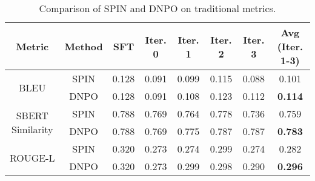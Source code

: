 \begin{appendices}
\begin{table}[ht]
\centering
\small
\renewcommand{\arraystretch}{0.9} %
\caption{Comparison of SPIN and DNPO on traditional metrics.}
\label{table5}
\begin{tabular}{cccccccc}
\toprule
\textbf{Metric}            & \textbf{Method} & \textbf{SFT} & \textbf{Iter. 0} & \textbf{Iter. 1} & \textbf{Iter. 2} & \textbf{Iter. 3} & \textbf{Avg (Iter. 1-3)} \\ 
\midrule
\multirow{2}{*}{BLEU}      & SPIN            & 0.128          & 0.091          & 0.099          & 0.115          & 0.088          & 0.101                 \\
                           & DNPO            & 0.128          & 0.091          & 0.108          & 0.123          & 0.112          & \textbf{0.114}        \\ 
\midrule
\multirow{2}{*}{SBERT Similarity} & SPIN      & 0.788          & 0.769          & 0.764          & 0.778          & 0.736          & 0.759                 \\
                           & DNPO            & 0.788          & 0.769          & 0.775          & 0.787          & 0.787          & \textbf{0.783}        \\ 
\midrule
\multirow{2}{*}{ROUGE-L}   & SPIN            & 0.320          & 0.273          & 0.274          & 0.299          & 0.274          & 0.282                 \\
                           & DNPO            & 0.320          & 0.273          & 0.299          & 0.298          & 0.290          & \textbf{0.296}        \\ 
\bottomrule
\end{tabular}
\end{table}




\newpage

\end{appendices}
